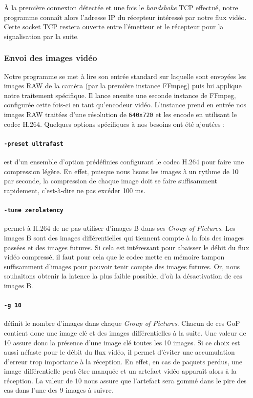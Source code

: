 \documentclass[11pt,a4paper]{article}
\begin{document}
\bigbreak
À la première connexion détectée et une fois le \textit{handshake} TCP effectué, notre programme connaît alors l'adresse IP du récepteur intéressé par notre flux vidéo.
Cette socket TCP restera ouverte entre l'émetteur et le récepteur pour la signalisation par la suite.

\subsubsection{Envoi des images vidéo}
Notre programme se met à lire son entrée standard sur laquelle sont envoyées les images RAW de la caméra (par la première instance FFmpeg) puis lui applique notre traitement spécifique.
Il lance ensuite une seconde instance de FFmpeg, configurée cette fois-ci en tant qu'encodeur vidéo.
L'instance prend en entrée nos images RAW traitées d'une résolution de \texttt{640x720} et les encode en utilisant le codec H.264.
Quelques options spécifiques à nos besoins ont été ajoutées :

\paragraph{\texttt{-preset ultrafast}} est d'un ensemble d'option prédéfinies configurant le codec H.264 pour faire une compression légère.
En effet, puisque nous lisons les images à un rythme de 10 par seconde, la compression de chaque image doit se faire suffisamment rapidement, c'est-à-dire ne pas excéder 100 ms.

\paragraph{\texttt{-tune zerolatency}} permet à H.264 de ne pas utiliser d'images B dans ses \textit{Group of Pictures}.
Les images B sont des images différentielles qui tiennent compte à la fois des images passées et des images futures.
Si cela est intéressant pour abaisser le débit du flux vidéo compressé, il faut pour cela que le codec mette en mémoire tampon suffisamment d'images pour pouvoir tenir compte des images futures.
Or, nous souhaitons obtenir la latence la plus faible possible, d'où la désactivation de ces images B.

\paragraph{\texttt{-g 10}} définit le nombre d'images dans chaque \textit{Group of Pictures}.
Chacun de ces GoP contient donc une image clé et des images différentielles à la suite.
Une valeur de 10 assure donc la présence d'une image clé toutes les 10 images.
Si ce choix est aussi néfaste pour le débit du flux vidéo, il permet d'éviter une accumulation d'erreur trop importante à la réception.
En effet, en cas de paquets perdus, une image différentielle peut être manquée et un artefact vidéo apparaît alors à la réception.
La valeur de 10 nous assure que l'artefact sera gommé dans le pire des cas dans l'une des 9 images à suivre.
\end{document}
